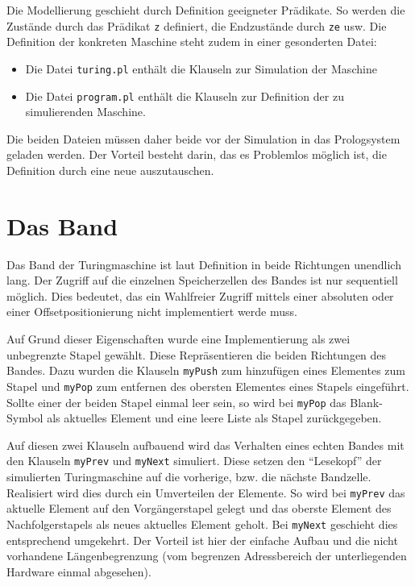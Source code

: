 \documentclass[final,a4paper,11pt,notitlepage,halfparskip]{scrreprt}
\begin{document}
Die Modellierung geschieht durch Definition geeigneter Prädikate. So
werden die Zustände durch das Prädikat \texttt{z} definiert, die
Endzustände durch \texttt{ze} usw. Die Definition der konkreten Maschine
steht zudem in einer gesonderten Datei: 
\begin{itemize}
    \item Die Datei \texttt{turing.pl} enthält die Klauseln zur
	Simulation der Maschine
    \item Die Datei \texttt{program.pl} enthält die Klauseln zur
	Definition der zu simulierenden Maschine.	
\end{itemize}
Die beiden Dateien müssen daher beide vor der Simulation in das
Prologsystem geladen werden. Der Vorteil besteht darin, das es
Problemlos möglich ist, die Definition durch eine neue auszutauschen.

\section{Das Band}
Das Band der Turingmaschine ist laut Definition in beide Richtungen
unendlich lang. Der Zugriff auf die einzelnen Speicherzellen des Bandes
ist nur sequentiell möglich. Dies bedeutet, das ein Wahlfreier Zugriff
mittels einer absoluten oder einer Offsetpositionierung nicht
implementiert werde muss.

Auf Grund dieser Eigenschaften wurde eine Implementierung als zwei
unbegrenzte Stapel gewählt. Diese Repräsentieren die beiden Richtungen
des Bandes. Dazu wurden die Klauseln \texttt{myPush} zum hinzufügen
eines Elementes zum Stapel und \texttt{myPop} zum entfernen des obersten
Elementes eines Stapels eingeführt. Sollte einer der beiden Stapel
einmal leer sein, so wird bei \texttt{myPop} das Blank-Symbol als 
aktuelles Element und eine leere Liste als Stapel zurückgegeben.

Auf diesen zwei Klauseln aufbauend wird das Verhalten eines echten
Bandes mit den Klauseln \texttt{myPrev} und \texttt{myNext} simuliert.
Diese setzen den "`Lesekopf"' der simulierten Turingmaschine auf die
vorherige, bzw. die nächste Bandzelle. Realisiert wird dies durch ein
Umverteilen der Elemente. So wird bei \texttt{myPrev} das aktuelle
Element auf den Vorgängerstapel gelegt und das oberste Element des
Nachfolgerstapels als neues aktuelles Element geholt. Bei
\texttt{myNext} geschieht dies entsprechend umgekehrt. Der Vorteil ist
hier der einfache Aufbau und die nicht vorhandene Längenbegrenzung (vom
begrenzen Adressbereich der unterliegenden Hardware einmal abgesehen).
\end{document}
